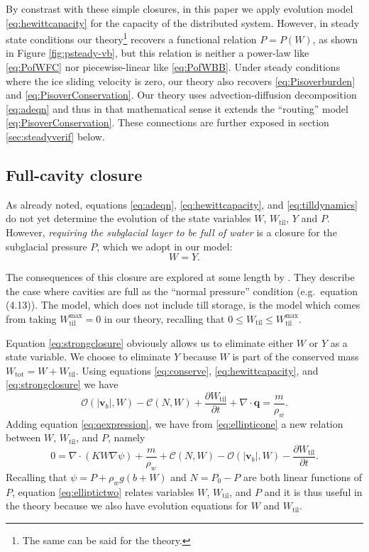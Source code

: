 \documentclass[11pt,final]{amsart}
\newcommand\bv{\mathbf{v}}
\newcommand\bq{\mathbf{q}}
\newcommand{\ddt}[1]{\ensuremath{\frac{\partial #1}{\partial t}}}
\newcommand{\Div}{\nabla\cdot}
\newcommand{\grad}{\nabla}
\newcommand{\Wtil}{W_{\text{til}}}
\newcommand{\Wtilmax}{W_{\text{til}}^{\text{max}}}
\newcommand{\Wtot}{W_{\text{tot}}}
\begin{document}
\medskip
By constrast with these simple closures, in this paper we apply evolution model \eqref{eq:hewittcapacity} for the capacity of the distributed system.  However, in steady state conditions our theory\footnote{The same can be said for the \cite{Schoofetal2012} theory.} recovers a functional relation $P=P(W)$, as shown in Figure \ref{fig:psteady-vb}, but this relation is neither a power-law like \eqref{eq:PofWFC} nor piecewise-linear like \eqref{eq:PofWBB}.  Under steady conditions where the ice sliding velocity is zero, our theory also recovers \eqref{eq:Pisoverburden} and \eqref{eq:PisoverConservation}.  Our theory uses advection-diffusion decomposition \eqref{eq:adeqn} and thus in that mathematical sense it extends the ``routing'' model \eqref{eq:PisoverConservation}.  These connections are further exposed in section \ref{sec:steadyverif} below.


\subsection*{Full-cavity closure}  As already noted, equations  \eqref{eq:adeqn}, \eqref{eq:hewittcapacity}, and \eqref{eq:tilldynamics} do not yet determine the evolution of the state variables $W$, $\Wtil$, $Y$ and $P$.  However, \emph{requiring the subglacial layer to be full of water} is a closure for the subglacial pressure $P$, which we adopt in our model:
\begin{equation}
W = Y.\label{eq:strongclosure}
\end{equation}

The consequences of this closure are explored at some length by \cite{Schoofetal2012}.  They describe the case where cavities are full as the ``normal pressure'' condition (e.g.~equation (4.13)).  The \cite{Schoofetal2012} model, which does not include till storage, is the model which comes from taking $\Wtilmax=0$ in our theory, recalling that $0 \le \Wtil \le \Wtilmax$.

Equation \eqref{eq:strongclosure} obviously allows us to eliminate either $W$ or $Y$ as a state variable.  We choose to eliminate $Y$ because $W$ is part of the conserved mass $\Wtot = W + \Wtil$.  Using equations \eqref{eq:conserve}, \eqref{eq:hewittcapacity}, and \eqref{eq:strongclosure} we have
\begin{equation}
\mathcal{O}(|\bv_b|,W) - \mathcal{C}(N,W) + \ddt{\Wtil} + \Div\bq = \frac{m}{\rho_w}. \label{eq:ellipticone}
\end{equation}
Adding equation \eqref{eq:qexpression}, we have from \eqref{eq:ellipticone} a new relation between $W$, $\Wtil$, and $P$, namely
\begin{equation}
0 = \Div\left(K W \grad \psi\right) + \frac{m}{\rho_w} + \mathcal{C}(N,W) - \mathcal{O}(|\bv_b|,W) - \ddt{\Wtil}. \label{eq:elliptictwo}
\end{equation}
Recalling that $\psi = P + \rho_w g (b+W)$ and $N=P_0-P$ are both linear functions of $P$, equation \eqref{eq:elliptictwo} relates variables $W$, $\Wtil$, and $P$ and it is thus useful in the theory because we also have evolution equations for $W$ and $\Wtil$.
\end{document}
